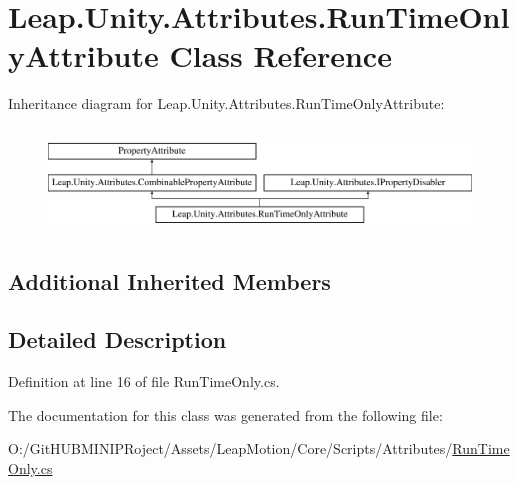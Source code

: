 \hypertarget{class_leap_1_1_unity_1_1_attributes_1_1_run_time_only_attribute}{}\section{Leap.\+Unity.\+Attributes.\+Run\+Time\+Only\+Attribute Class Reference}
\label{class_leap_1_1_unity_1_1_attributes_1_1_run_time_only_attribute}
Inheritance diagram for Leap.\+Unity.\+Attributes.\+Run\+Time\+Only\+Attribute\+:\begin{figure}[H]
\begin{center}
\leavevmode
\includegraphics[height=2.772277cm]{class_leap_1_1_unity_1_1_attributes_1_1_run_time_only_attribute}
\end{center}
\end{figure}
\subsection*{Additional Inherited Members}


\subsection{Detailed Description}


Definition at line 16 of file Run\+Time\+Only.\+cs.



The documentation for this class was generated from the following file\+:\begin{DoxyCompactItemize}
\item 
O\+:/\+Git\+H\+U\+B\+M\+I\+N\+I\+P\+Roject/\+Assets/\+Leap\+Motion/\+Core/\+Scripts/\+Attributes/\mbox{\hyperlink{_run_time_only_8cs}{Run\+Time\+Only.\+cs}}\end{DoxyCompactItemize}
